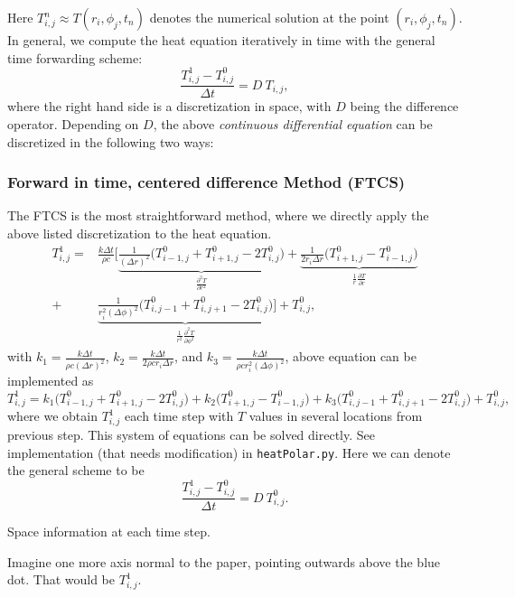 \documentclass[12pt]{article}
\newcommand{\stencilpt}[4][]{\node[circle,fill,draw,inner sep=1.5pt,label={above left:#4},#1] at (#2) (#3) {}}
\begin{document}
Here $T^n_{i,j} \approx T(r_i,\phi_j,t_n)$ denotes the numerical solution at the point $(r_i,\phi_j,t_n)$. In general, we compute the heat equation iteratively in time with the general time forwarding scheme: 
\begin{equation}
\frac{T^1_{i,j}-T^0_{i,j}}{\Delta t}=D\ T_{i,j},
\end{equation}
where the right hand side is a discretization in space, with $D$ being the difference operator. Depending on $D$, the above {\it continuous differential equation} can be discretized in the following two ways:
\subsubsection{Forward in time, centered difference Method (FTCS)}
The FTCS is the most straightforward method, where we directly apply the above listed discretization to the heat equation. 
\begin{align}
T^1_{i,j}=& \frac{k\Delta t}{\rho c}\bigg[\underbrace{\frac{1}{(\Delta r)^2}\bigg(T^0_{i-1,j}+T^0_{i+1,j}-2T^0_{i,j}\bigg)}_{\frac{\partial^2T}{\partial r^2}}+\underbrace{\frac{1}{2r_i\Delta r}\bigg(T^0_{i+1,j}-T^0_{i-1,j}\bigg)}_{\frac{1}{r}\frac{\partial T}{\partial r}}\nonumber\\
+& \underbrace{\frac{1}{r_i^2(\Delta \phi)^2}\bigg(T^0_{i,j-1}+T^0_{i,j+1}-2T^0_{i,j}\bigg)}_{\frac{1}{r^2}\frac{\partial^2 T}{\partial \phi^2}}\bigg]+T^0_{i,j},
\end{align}
with $k_1= \frac{k\Delta t}{\rho c(\Delta r)^2}$, $k_2 = \frac{k\Delta t}{2\rho cr_i\Delta r}$, and $k_3= \frac{k\Delta t}{\rho cr_i^2(\Delta \phi)^2}$, above equation can be implemented as
\begin{equation}
T^1_{i,j}= k_1\bigg(T^0_{i-1,j}+T^0_{i+1,j}-2T^0_{i,j}\bigg)+k_2\bigg(T^0_{i+1,j}-T^0_{i-1,j}\bigg)
+k_3\bigg(T^0_{i,j-1}+T^0_{i,j+1}-2T^0_{i,j}\bigg)+T^0_{i,j},
\end{equation}
where we obtain $T^1_{i,j}$ each time step with $T$ values in several locations from previous step. This system of equations can be solved directly. See implementation (that needs modification) in {\tt heatPolar.py}. Here we can denote the general scheme to be 
\begin{equation}
\frac{T^1_{i,j}-T^0_{i,j}}{\Delta t}=D\ T^0_{i,j}.
\end{equation}

\begin{center}

Space information at each time step.
\end{center}
Imagine one more axis normal to the paper, pointing outwards above the blue dot. That would be $T^1_{i,j}$. 
\end{document}
